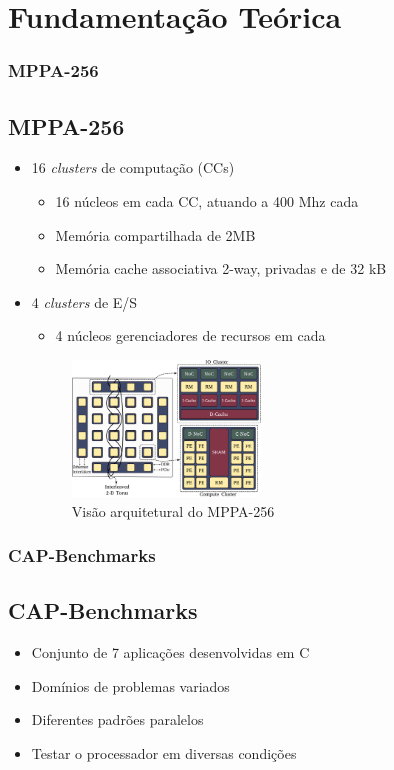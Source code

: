 \documentclass[xcolor={table}]{beamer}
\begin{document}
\section{Fundamentação Teórica}
\begin{frame}\frametitle{MPPA-256}
    \subsection{MPPA-256}
    \begin{itemize}
        \item{16 \textit{clusters} de computação (CCs)}
        \begin{itemize}
            \item 16 núcleos em cada CC, atuando a 400 Mhz cada
            \item Memória compartilhada de 2MB
            \item Memória cache associativa 2-way, privadas e de 32 kB
        \end{itemize}
        \item{4 \textit{clusters} de E/S}
        \begin{itemize}
            \item 4 núcleos gerenciadores de recursos em cada
        \end{itemize}
        \begin{figure}
            \centering
            \includegraphics[width=5cm, keepaspectratio]{figs/mppa-overview.pdf}
            \caption{Visão arquitetural do MPPA-256 \cite{Penna2018}}
            \label{fig:rhs+}
        \end{figure}
    \end{itemize}
\end{frame}

\begin{frame}\frametitle{CAP-Benchmarks \cite{Castro-Souza-CCPE:2016}}
    \subsection{CAP-Benchmarks}
    \begin{itemize}
        \item {Conjunto de 7 aplicações desenvolvidas em C}
    	\item {Domínios de problemas variados}
    	\item {Diferentes padrões paralelos}
    	\item {Testar o processador em diversas condições}
    \end{itemize}
\end{frame}
\end{document}
